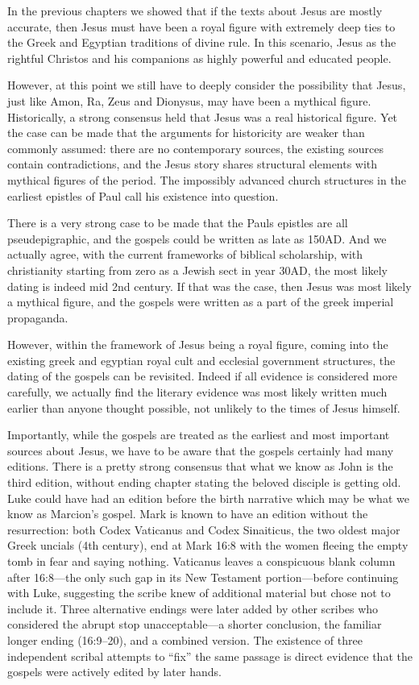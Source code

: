 In the previous chapters we showed that if the texts about Jesus are mostly accurate, then Jesus must have been a royal figure with extremely deep ties to the Greek and Egyptian traditions of divine rule.
In this scenario, Jesus as the rightful Christos and his companions as highly powerful and educated people.

However, at this point we still have to deeply consider the possibility that Jesus, just like Amon, Ra, Zeus and Dionysus, may have been a mythical figure.
Historically, a strong consensus held that Jesus was a real historical figure.
Yet the case can be made that the arguments for historicity are weaker than commonly assumed: there are no contemporary sources, the existing sources contain contradictions, and the Jesus story shares structural elements with mythical figures of the period.
The impossibly advanced church structures in the earliest epistles of Paul call his existence into question.

There is a very strong case to be made that the Pauls epistles are all pseudepigraphic, and the gospels could be written as late as 150AD.
And we actually agree, with the current frameworks of biblical scholarship, with christianity starting from zero as a Jewish sect in year 30AD, the most likely dating is indeed mid 2nd century.
If that was the case, then Jesus was most likely a mythical figure, and the gospels were written as a part of the greek imperial propaganda.

However, within the framework of Jesus being a royal figure, coming into the existing greek and egyptian royal cult and ecclesial government structures, the dating of the gospels can be revisited.
Indeed if all evidence is considered more carefully, we actually find the literary evidence was most likely written much earlier than anyone thought possible, not unlikely to the times of Jesus himself.

Importantly, while the gospels are treated as the earliest and most important sources about Jesus, we have to be aware that the gospels certainly had many editions.
There is a pretty strong consensus that what we know as John is the third edition, without ending chapter stating the beloved disciple is getting old.
Luke could have had an edition before the birth narrative which may be what we know as Marcion's gospel.
Mark is known to have an edition without the resurrection: both Codex Vaticanus and Codex Sinaiticus, the two oldest major Greek uncials (4th century), end at Mark 16:8 with the women fleeing the empty tomb in fear and saying nothing.
Vaticanus leaves a conspicuous blank column after 16:8---the only such gap in its New Testament portion---before continuing with Luke, suggesting the scribe knew of additional material but chose not to include it.
Three alternative endings were later added by other scribes who considered the abrupt stop unacceptable---a shorter conclusion, the familiar longer ending (16:9--20), and a combined version.
The existence of three independent scribal attempts to ``fix'' the same passage is direct evidence that the gospels were actively edited by later hands.

